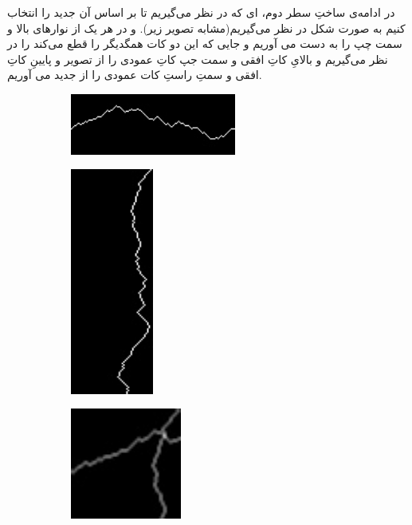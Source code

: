 \documentclass[a4paper,12pt]{article}
\begin{document}
\begin{figure}[H]
\begin{subfigure}{0.33\textwidth}
	\end{subfigure}%
\end{figure}
در ادامه‌ی ساختِ سطر دوم، 
‌ای
که در نظر می‌گیریم تا بر اساس آن 
جدید را انتخاب کنیم به صورت
شکل در نظر می‌گیریم(مشابه تصویر زیر). و در هر یک از نوار‌های بالا و سمت چپ 
را به دست می آوریم و جایی که این دو کات همگدیگر را قطع می‌کند را در نظر می‌گیریم و بالا‌یِ کاتِ افقی و سمت جپ کاتِ عمودی را از تصویر 
و پایینِ کاتِ افقی و سمتِ راستِ کات عمودی را از 
جدید می آوریم.
 \begin{figure}[H]
	\centering
	\begin{subfigure}{0.2\textwidth}
		\centering
		\includegraphics[width=0.6\textwidth]{13.png}
	\end{subfigure}%
	\begin{subfigure}{0.2\textwidth}
		\centering
		\includegraphics[width=0.3\textwidth]{12.png}
	\end{subfigure}%
	\begin{subfigure}{0.2\textwidth}
		\centering
		\includegraphics[width=0.4\textwidth]{11.png}
	\end{subfigure}%
\end{figure}
\end{document}
